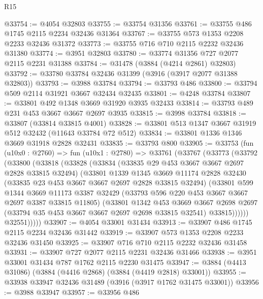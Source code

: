 \begin{lexlean}{R15}
\begin{coremodule}
@33754 := @4054 @32803
@33755 := @33754 @31356
@33761 := @33755 @486 @1745 @2115 @2234 @32436 @31364
@33767 := @33755 @573 @1353 @2208 @2233 @32436 @31372
@33773 := @33755 @716 @710 @2115 @2232 @32436 @31380
@33774 := @3951 @32803
@33780 := @33774 @31356 @727 @2077 @2115 @2231 @31388
@33784 := @31478 (@3884 (@4214 @2861) @32803)
@33792 := @33780 @33784 @32436 @31399 (@3916 (@3917 @2077 @31388 @32803))
@33793 := @3988 @33784
@33794 := @33793 @486
@33800 := @33794 @509 @2114 @31921 @3667 @32434 @32435
@33801 := @4248 @33784
@33807 := @33801 @492 @1348 @3669 @31920 @3935 @32433
@33814 := @33793 @489 @231 @453 @3667 @3667 @2697 @3935
@33815 := @3998 @33784
@33818 := @33807 (@33814 @33815 @4001)
@33828 := @33801 @513 @1347 @3667 @31919 @512 @32432 (@11643 @33784 @72 @512)
@33834 := @33801 @1336 @1346 @3669 @31918 @2828 @32431
@33835 := @33793 @800
@33905 := @33753
    (fun (u10x0 : @2760) =>
    fun (u10x1 : @2780) =>
    @33761
      (@33767
        (@33773
          (@33792
            (@33800
              (@33818
                (@33828
                  (@33834
                    (@33835 @29 @453 @3667 @3667 @2697 @2828 @33815 @32494)
                    (@33801
                      @1339
                      @1345
                      @3669
                      @11174
                      @2828
                      @32430
                      (@33835 @23 @453 @3667 @3667 @2697 @2828 @33815 @32494)
                      (@33801
                        @599
                        @1344
                        @3669
                        @11173
                        @3387
                        @32429
                        (@33793 @596 @220 @453 @3667 @3667 @2697 @3387 @33815 @11805)
                        (@33801
                          @1342
                          @453
                          @3669
                          @3667
                          @2698
                          @2697
                          (@33794 @35 @453 @3667 @3667 @2697 @2698 @33815 @32541)
                          @33815))))))
              @32551)))))
@33907 := @4054 @33001 @31434
@33913 := @33907 @486 @1745 @2115 @2234 @32436 @31442
@33919 := @33907 @573 @1353 @2208 @2233 @32436 @31450
@33925 := @33907 @716 @710 @2115 @2232 @32436 @31458
@33931 := @33907 @727 @2077 @2115 @2231 @32436 @31466
@33938 := @3951 @33001 @31434 @787 @1762 @2115 @2230 @31475
@33947 := @3884 (@4413 @31086) (@3884 (@4416 @2868) (@3884 (@4419 @2818) @33001))
@33955 := @33938 @33947 @32436 @31489 (@3916 (@3917 @1762 @31475 @33001))
@33956 := @3988 @33947
@33957 := @33956 @486

\end{coremodule}
\end{lexlean}
